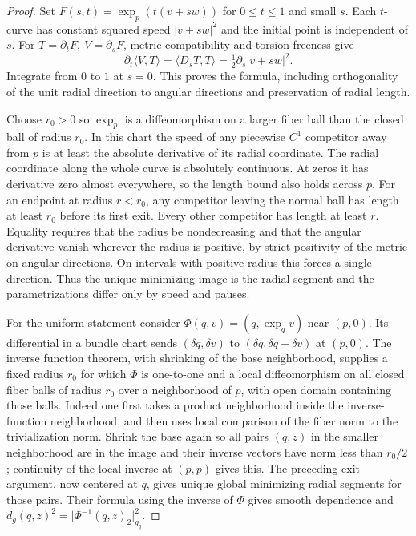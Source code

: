 \documentclass[11pt,oneside,openany]{book}
\theoremstyle{plain}
\theoremstyle{definition}
\theoremstyle{remark}
\begin{document}
\begin{proof}
Set \(F(s,t)=\exp_p(t(v+s w))\) for \(0\leq t\leq1\) and
small \(s\). Each \(t\)-curve has constant squared speed
\(\lvert v+s w\rvert^2\) and the initial point is independent
of \(s\). For \(T=\partial_tF,\ V=\partial_sF\), metric compatibility
and torsion freeness give
\[
 \partial_t\langle V,T\rangle
 =\langle D_sT,T\rangle
 =\tfrac12\partial_s\lvert v+s w\rvert^2 .
\]
Integrate from \(0\) to \(1\) at \(s=0\).
This proves the formula, including orthogonality of the unit radial
direction to angular directions and preservation of radial length.

Choose \(r_0>0\) so \(\exp_p\) is a diffeomorphism on a larger
fiber ball than the closed ball of radius \(r_0\).
In this chart the speed of any piecewise \(C^1\) competitor
away from \(p\) is at least the absolute derivative of its radial
coordinate. The radial coordinate along the whole curve is
absolutely continuous. At zeros it has derivative zero almost
everywhere, so the length bound also holds across \(p\).
For an endpoint at radius \(r<r_0\), any competitor leaving
the normal ball has length at least \(r_0\) before its first exit.
Every other competitor has length at least \(r\). Equality
requires that the radius be nondecreasing and that the angular
derivative vanish wherever the radius is positive, by strict
positivity of the metric on angular directions. On intervals
with positive radius this forces a single direction. Thus
the unique minimizing image is the radial segment and the
parametrizations differ only by speed and pauses.

For the uniform statement consider
\(\Phi(q,v)=(q,\exp_q v)\) near \((p,0)\).
Its differential in a bundle chart sends
\((\delta q,\delta v)\) to \((\delta q,\delta q+\delta v)\)
at \((p,0)\). The inverse function theorem, with shrinking of
the base neighborhood, supplies a fixed radius \(r_0\) for
which \(\Phi\) is one-to-one and a local diffeomorphism on
all closed fiber balls of radius \(r_0\) over a neighborhood
of \(p\), with open domain containing those balls.
Indeed one first takes a product neighborhood inside the
inverse-function neighborhood, and then uses local comparison
of the fiber norm to the trivialization norm. Shrink the base
again so all pairs \((q,z)\) in the smaller neighborhood are
in the image and their inverse vectors have norm less than
\(r_0/2\); continuity of the local inverse at \((p,p)\) gives this.
The preceding exit argument, now centered at \(q\), gives unique
global minimizing radial segments for those pairs. Their formula
using the inverse of \(\Phi\) gives smooth dependence and
\(d_g(q,z)^2=\lvert\Phi^{-1}(q,z)_2\rvert_{g_q}^2\).


\end{proof}
\end{document}
